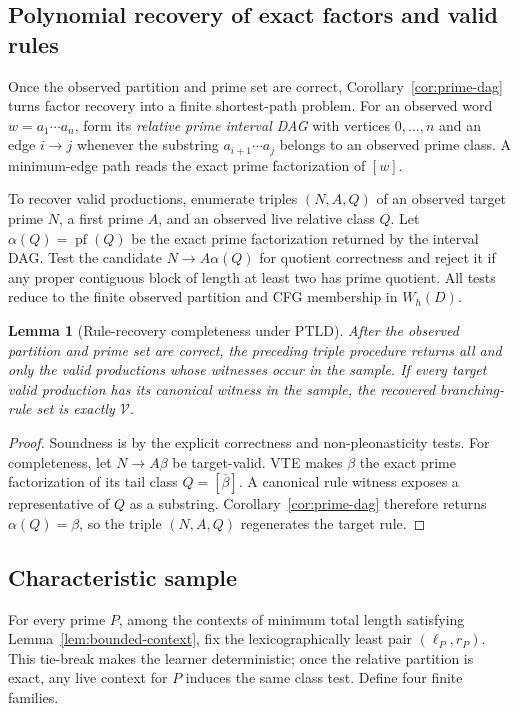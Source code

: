 \documentclass[11pt,a4paper]{article}
\newtheorem{lemma}[theorem]{Lemma}
\newcommand{\Vcal}{\mathcal V}
\begin{document}
\subsection{Polynomial recovery of exact factors and valid rules}

Once the observed partition and prime set are correct, Corollary~\ref{cor:prime-dag} turns factor recovery into a finite shortest-path problem.  For an observed word $w=a_1\cdots a_n$, form its \emph{relative prime interval DAG} with vertices $0,\ldots,n$ and an edge $i\to j$ whenever the substring $a_{i+1}\cdots a_j$ belongs to an observed prime class.  A minimum-edge path reads the exact prime factorization of $[w]$.

To recover valid productions, enumerate triples $(N,A,Q)$ of an observed target prime $N$, a first prime $A$, and an observed live relative class $Q$.  Let
\(\alpha(Q)=\operatorname{pf}(Q)\)
be the exact prime factorization returned by the interval DAG.  Test the candidate
\(N\to A\alpha(Q)\)
for quotient correctness and reject it if any proper contiguous block of length at least two has prime quotient.  All tests reduce to the finite observed partition and CFG membership in $W_h(D)$.

\begin{lemma}[Rule-recovery completeness under PTLD]
\label{lem:rule-recovery}
After the observed partition and prime set are correct, the preceding triple procedure returns all and only the valid productions whose witnesses occur in the sample.  If every target valid production has its canonical witness in the sample, the recovered branching-rule set is exactly $\Vcal$.
\end{lemma}

\begin{proof}
Soundness is by the explicit correctness and non-pleonasticity tests.  For completeness, let $N\to A\beta$ be target-valid.  VTE makes $\beta$ the exact prime factorization of its tail class $Q=[\overline\beta]$.  A canonical rule witness exposes a representative of $Q$ as a substring.  Corollary~\ref{cor:prime-dag} therefore returns $\alpha(Q)=\beta$, so the triple $(N,A,Q)$ regenerates the target rule.
\end{proof}

\subsection{Characteristic sample}

For every prime $P$, among the contexts of minimum total length satisfying Lemma~\ref{lem:bounded-context}, fix the lexicographically least pair $(\ell_P,r_P)$.  This tie-break makes the learner deterministic; once the relative partition is exact, any live context for $P$ induces the same class test.  Define four finite families.
\end{document}
